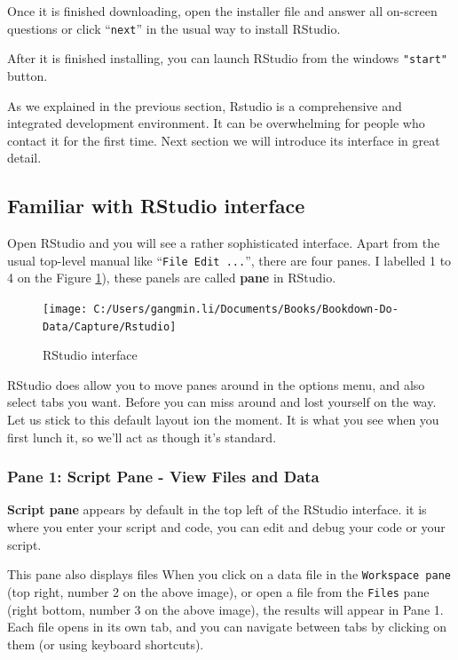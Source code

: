 \documentclass[
]{book}
\begin{document}
Once it is finished downloading, open the installer file and answer all on-screen questions or click ``\texttt{next}'' in the usual way to install RStudio.

After it is finished installing, you can launch RStudio from the windows \texttt{"start"} button.

As we explained in the previous section, Rstudio is a comprehensive and integrated development environment. It can be overwhelming for people who contact it for the first time. Next section we will introduce its interface in great detail.

\hypertarget{familiar-with-rstudio-interface}{%
\subsection*{Familiar with RStudio interface}\label{familiar-with-rstudio-interface}}


Open RStudio and you will see a rather sophisticated interface. Apart from the usual top-level manual like ``\texttt{File\ Edit\ ...}'', there are four panes. I labelled 1 to 4 on the Figure \ref{fig:RStudio}), these panels are called \textbf{pane} in RStudio.

\begin{figure}

{\centering \texttt{[image: C:/Users/gangmin.li/Documents/Books/Bookdown-Do-Data/Capture/Rstudio]} 

}

\caption{RStudio interface}\label{fig:RStudio}
\end{figure}

RStudio does allow you to move panes around in the options menu, and also select tabs you want. Before you can miss around and lost yourself on the way. Let us stick to this default layout ion the moment. It is what you see when you first lunch it, so we'll act as though it's standard.

\hypertarget{pane-1-script-pane---view-files-and-data}{%
\subsubsection*{Pane 1: Script Pane - View Files and Data}\label{pane-1-script-pane---view-files-and-data}}


\textbf{Script pane} appears by default in the top left of the RStudio interface. it is where you enter your script and code, you can edit and debug your code or your script.

This pane also displays files When you click on a data file in the \texttt{Workspace\ pane} (top right, number 2 on the above image), or open a file from the \texttt{Files} pane (right bottom, number 3 on the above image), the results will appear in Pane 1. Each file opens in its own tab, and you can navigate between tabs by clicking on them (or using keyboard shortcuts).
\end{document}
